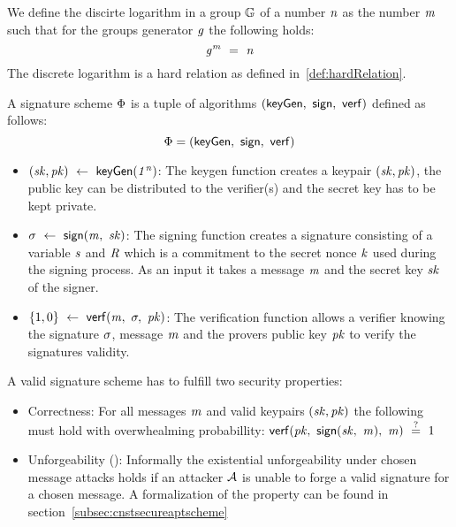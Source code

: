 \begin{definition}\label{def:discretelog}
    We define the discirte logarithm in a group $\mathbb{G}$ of a number $\mathit{n}$ as the number $\mathit{m}$ such that for the groups generator $\mathit{g}$ the following holds:
    \[ \mathit{g}^{\mathit{m}} ~=~ \mathit{n} \]
    The discrete logarithm is a hard relation as defined in~\ref{def:hardRelation}.
\end{definition}

\begin{definition}\label{def:signatureScheme}
    A signature scheme $\Phi$ is a tuple of algorithms $(\mathsf{keyGen} ,~ \mathsf{sign} ,~ \mathsf{verf})$ defined as follows: \cite{goldwasser1988digital}
    \[ \Phi = (\mathsf{keyGen} ,~ \mathsf{sign} ,~ \mathsf{verf}) \]

    \begin{itemize}
        \item $(\mathit{sk}, \mathit{pk}) ~\leftarrow~ \mathsf{keyGen}(\mathit{1^n})$: The keygen function creates a keypair $(\mathit{sk}, \mathit{pk})$, the public key can be distributed to the verifier(s) and the secret key has to be kept private. \\
        \item $\sigma ~\leftarrow~ \mathsf{sign}(\mathit{m} ,~ \mathit{sk})$: The signing function creates a signature consisting of a variable $\mathit{s}$ and $\mathit{R}$ which is a commitment to the secret nonce $\mathit{k}$ used during the signing process.
        As an input it takes a message $\mathit{m}$ and the secret key $\mathit{sk}$ of the signer.
        \item $\{1,0\} ~\leftarrow~ \mathsf{verf}(\mathit{m} ,~ \sigma ,~ \mathit{pk})$: The verification function allows a verifier knowing the signature $\sigma$, message $\mathit{m}$ and the provers public key $\mathit{pk}$ to verify the signatures
        validity. \\
    \end{itemize}

    A valid signature scheme has to fulfill two security properties:
    \begin{itemize}
        \item Correctness: For all messages $\mathit{m}$ and valid keypairs $(\mathit{sk}, \mathit{pk})$ the following must hold with overwhealming probabillity: $\mathsf{verf}(\mathit{pk} ,~ \mathsf{sign}(\mathit{sk} ,~ \mathit{m}) ,~ \mathit{m}) ~\stackrel{?}{=}~ 1$
        \item Unforgeability (\cnstEUFCMA): Informally the existential unforgeability under chosen message attacks holds if an attacker $\mathcal{A}$ is unable to forge a valid signature for a chosen message.
        A formalization of the property can be found in section~\ref{subsec:cnstsecureaptscheme}
    \end{itemize}
\end{definition}

